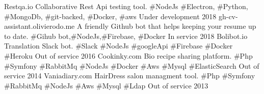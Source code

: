 
\begin{cvhonors}

  \cvhonor
    {Restqa.io} %
    {Collaborative Rest Api testing tool. \#NodeJs \#Electron, \#Python,  \#MongoDb, \#git-backed, \#Docker, \#aws}
    {Under development} %
    {2018} %
  \cvhonor
    {gh-cv-assistant.olivierodo.me} %
    {A friendly Github bot that helps keeping your resume up to date. \#Gihub bot,\#NodeJs,\#Firebase, \#Docker}
    {In service} %
    {2018} %
  \cvhonor
    {Bolibot.io} %
    {Translation Slack bot.  \#Slack \#NodeJs \#googleApi \#Firebase \#Docker \#Heroku}
    {Out of service} %
    {2016} %
  \cvhonor
    {Cookinky.com} %
    {Bio recipe sharing platform. \#Php \#Symfony \#RabbitMq \#NodeJs  \#Docker \#Aws \#Mysql \#ElasticSearch}
    {Out of service} %
    {2014} %
  \cvhonor
    {Vaniadiary.com} %
    {HairDress salon managment tool. \#Php \#Symfony \#RabbitMq \#NodeJs \#Aws \#Mysql \#Ldap}
    {Out of service} %
    {2013} %

\end{cvhonors}
